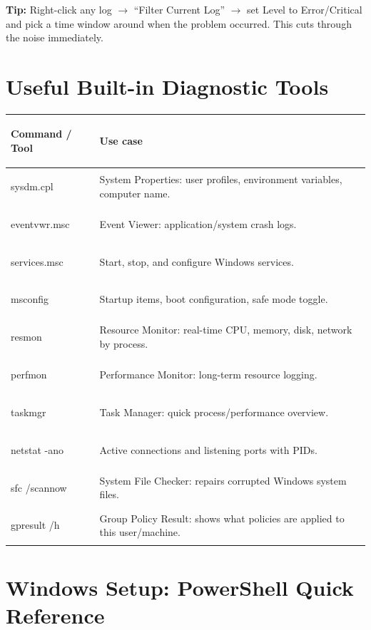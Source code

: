 \documentclass[11pt, letterpaper]{article}
\begin{document}
\textbf{Tip:} Right-click any log $\to$ ``Filter Current Log'' $\to$ set Level to Error/Critical and pick a time window around when the problem occurred. This cuts through the noise immediately.

\section*{Useful Built-in Diagnostic Tools}

\noindent
{\renewcommand{\arraystretch}{1.5}
\begin{tabularx}{\textwidth}{>{\ttfamily\bfseries\raggedright\arraybackslash}p{3.8cm}
                              >{\raggedright\arraybackslash}X}
\toprule
\rowcolor{tableheader}
\textbf{Command / Tool} & \textbf{Use case} \\
\midrule
\rowcolor{rowA}  sysdm.cpl     & System Properties: user profiles, environment variables, computer name. \\
\rowcolor{rowB}  eventvwr.msc  & Event Viewer: application/system crash logs. \\
\rowcolor{rowA}  services.msc  & Start, stop, and configure Windows services. \\
\rowcolor{rowB}  msconfig      & Startup items, boot configuration, safe mode toggle. \\
\rowcolor{rowA}  resmon        & Resource Monitor: real-time CPU, memory, disk, network by process. \\
\rowcolor{rowB}  perfmon       & Performance Monitor: long-term resource logging. \\
\rowcolor{rowA}  taskmgr       & Task Manager: quick process/performance overview. \\
\rowcolor{rowB}  netstat -ano  & Active connections and listening ports with PIDs. \\
\rowcolor{rowA}  sfc /scannow  & System File Checker: repairs corrupted Windows system files. \\
\rowcolor{rowB}  gpresult /h   & Group Policy Result: shows what policies are applied to this user/machine. \\
\bottomrule
\end{tabularx}}

\section*{Windows Setup: PowerShell Quick Reference}
\end{document}
